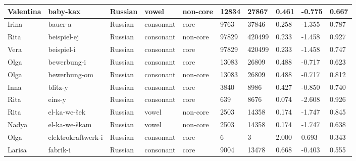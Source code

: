 \begin{longtable}{|p{1.2cm}|p{3cm}|p{1cm}|p{1.5cm}|p{1.5cm}|R{1.2cm}|R{1cm}|R{1cm}|R{0.8cm}|R{0.8cm}|}
Valentina & baby-kax               & Russian       & vowel            & non-core  & 12834        & 27867          & 0.461                 & -0.775            & 0.667        \\ \hline
Irina     & bauer-a                & Russian       & consonant        & core      & 9763         & 37846          & 0.258                 & -1.355            & 0.787        \\ \hline
Rita      & beispiel-ej            & Russian       & consonant        & non-core  & 97829        & 420499         & 0.233                 & -1.458            & 0.927        \\ \hline
Vera      & beispiel-i             & Russian       & consonant        & core      & 97829        & 420499         & 0.233                 & -1.458            & 0.747        \\ \hline
Olga      & bewerbung-i            & Russian       & consonant        & core      & 13083        & 26809          & 0.488                 & -0.717            & 0.623        \\ \hline
Olga      & bewerbung-om           & Russian       & consonant        & non-core  & 13083        & 26809          & 0.488                 & -0.717            & 0.812        \\ \hline
Inna      & blitz-y                & Russian       & consonant        & core      & 3840         & 8986           & 0.427                 & -0.850            & 0.740        \\ \hline
Rita      & eins-y                 & Russian       & consonant        & core      & 639          & 8676           & 0.074                 & -2.608            & 0.926        \\ \hline
Rita      & el-ka-we-\v{s}ek       & Russian       & vowel            & non-core  & 2503         & 14358          & 0.174                 & -1.747            & 0.845        \\ \hline
Nadya     & el-ka-we-\v{s}kam      & Russian       & vowel            & non-core  & 2503         & 14358          & 0.174                 & -1.747            & 0.638        \\ \hline
Olga      & elektrokraftwerk-i     & Russian       & consonant        & core      & 6            & 3              & 2.000                 & 0.693             & 0.343        \\ \hline
Larisa    & fabrik-i               & Russian       & consonant        & core      & 9004         & 13478          & 0.668                 & -0.403            & 0.555        \\ \hline

\end{longtable}
